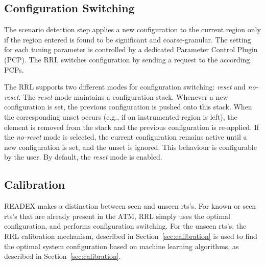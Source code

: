\subsection{Configuration Switching}\label{config-switching}
The scenario detection step applies a new configuration to the current region only if the region entered is found to be significant and coarse-granular. The setting for each tuning parameter is controlled by a dedicated Parameter Control Plugin (PCP). The RRL switches configuration by sending a request to the according PCPs. 

The RRL supports two different modes for configuration switching: \textit{reset} and \textit{no-reset}. The \textit{reset} mode maintains a configuration stack. Whenever a new configuration is set, the previous configuration is pushed onto this stack. When the corresponding unset occurs (e.g., if an instrumented region is left), the element is removed from the stack and the previous configuration is re-applied. If the \textit{no-reset} mode is selected, the current configuration remains active until a new configuration is set, and the unset is ignored. This behaviour is configurable by the user. By default, the \textit{reset} mode is enabled.

\subsection{Calibration}\label{calibr}
READEX makes a distinction between seen and unseen rts's. For known or seen rts's that are already present in the ATM, RRL simply uses the optimal configuration, and performs configuration switching. For the unseen rts's, the RRL calibration mechanism, described in Section~\ref{sec:calibration} is used to find the optimal system configuration based on machine learning algorithms, as described in Section~\ref{sec:calibration}.

 

 